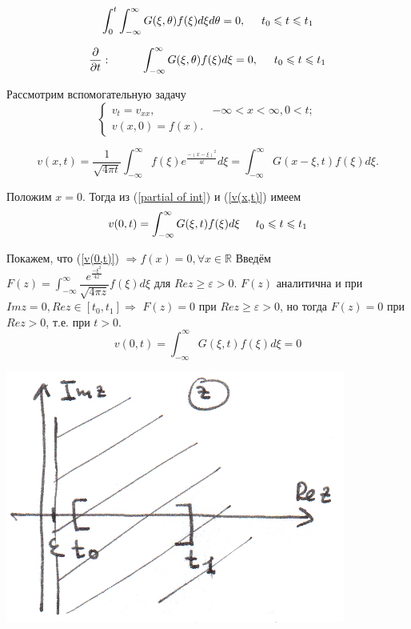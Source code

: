 \documentclass{article}
\begin{document}
\begin{equation}
\int_0^t \int_{-\infty}^{\infty} G(\xi, \theta) f(\xi) d\xi d \theta = 0,
 \hspace{0.5cm} t_0 \leqslant t \leqslant t_1
\end{equation}

\begin{equation}
\dfrac{\partial}{\partial t}: \hspace{1cm}
\int_{-\infty}^{\infty} G(\xi, \theta) f(\xi) d\xi = 0,
 \hspace{0.5cm} t_0 \leqslant t \leqslant t_1
\label{partial of int}
\end{equation}

Рассмотрим вспомогательную задачу
\[
\begin{cases}
v_t = v_{xx}, & -\infty < x < \infty, 0 < t;\\
v(x,0) = f(x).
\end{cases}
\]

\begin{equation}
v(x,t) = \dfrac{1}{\sqrt{4 \pi t}} \int_{-\infty}^{\infty} f(\xi) e^{\frac{-(x-\xi)^2}{4t}} d\xi = 
\int_{-\infty}^{\infty} G(x-\xi, t) f(\xi) d\xi.
\label{v(x,t)}
\end{equation}

Положим $x = 0$. Тогда из (\ref{partial of int}) и (\ref{v(x,t)}) имеем
\begin{equation}
v(0,t) = \int_{-\infty}^{\infty} G(\xi, t) f(\xi) d\xi
 \hspace{0.5cm} t_0 \leqslant t \leqslant t_1
 \label{v(0,t)}
\end{equation}

Покажем, что (\ref{v(0,t)}) $\Rightarrow f(x) = 0, \forall x \in \mathbb{R}$
Введём $F(z) = \int_{-\infty}^{\infty} \dfrac{e^{\frac{-\xi^2}{4z}}}{\sqrt{4 \pi z}} f(\xi) d\xi$ для $Re z \geqslant \varepsilon > 0$.
 $F(z)$ аналитична и  при $Im z = 0, Re z \in [t_0,t_1] \Rightarrow$ $F(z) = 0$ при $Re z \geqslant \varepsilon > 0$, но тогда $F(z) = 0$ при $Re z > 0$, т.е. при $t>0$.
$$
v(0,t) = \int_{-\infty}^{\infty} G(\xi, t) f(\xi) d\xi = 0
$$
 
\vspace{0.2cm}
\includegraphics[scale=0.85]{pic4_1.png}
\vspace{0.2cm}
\end{document}
